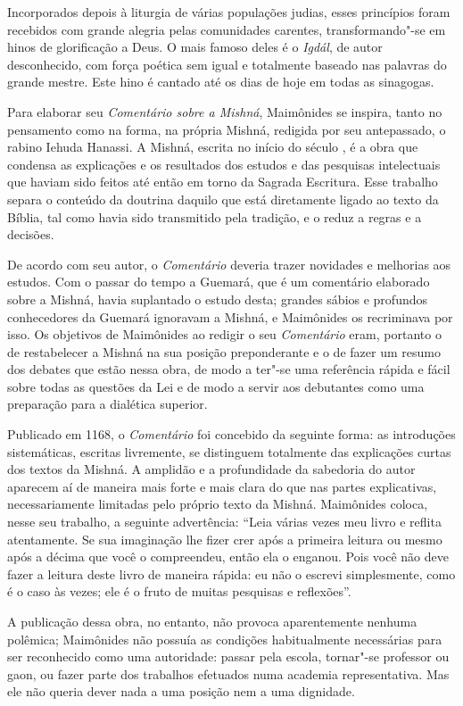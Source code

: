 Incorporados depois à liturgia de várias populações judias, esses
princípios foram recebidos com grande alegria pelas comunidades
carentes, transformando"-se em hinos de glorificação a Deus. O mais
famoso deles é o \emph{Igdál}, de autor desconhecido, com força poética sem
igual e totalmente baseado nas palavras do grande mestre. Este hino é
cantado até os dias de hoje em todas as sinagogas.

Para elaborar seu \emph{Comentário sobre a Mishná}, Maimônides se
inspira, tanto no pensamento como na forma, na própria Mishná,
redigida por seu antepassado, o rabino Iehuda Hanassi. A Mishná, escrita no
início do século , é a obra que condensa as explicações e os
resultados dos estudos e das pesquisas intelectuais que haviam sido
feitos até então em torno da Sagrada Escritura. Esse trabalho separa o
conteúdo da doutrina daquilo que está diretamente ligado ao texto da
Bíblia, tal como havia sido transmitido pela tradição, e o reduz a
regras e a decisões.

De acordo com seu autor, o \emph{Comentário} deveria trazer novidades e
melhorias aos estudos. Com o passar do tempo a Guemará, que é um
comentário elaborado sobre a Mishná, havia suplantado o estudo
desta; grandes sábios e profundos conhecedores da Guemará
ignoravam a Mishná, e Maimônides os recriminava por isso. Os
objetivos de Maimônides ao redigir o seu \emph{Comentário} eram,
portanto o de restabelecer a Mishná na sua posição preponderante
e o de fazer um resumo dos debates que estão nessa obra, de modo a
ter"-se uma referência rápida e fácil sobre todas as questões da Lei e de
modo a servir aos debutantes como uma preparação para a dialética
superior.

Publicado em 1168, o \emph{Comentário} foi concebido da seguinte forma:
as introduções sistemáticas, escritas livremente, se distinguem
totalmente das explicações curtas dos textos da Mishná. A
amplidão e a profundidade da sabedoria do autor aparecem aí de maneira
mais forte e mais clara do que nas partes explicativas, necessariamente
limitadas pelo próprio texto da Mishná. Maimônides coloca, nesse
seu trabalho, a seguinte advertência: ``Leia várias vezes meu livro e
reflita atentamente. Se sua imaginação lhe fizer crer após a primeira
leitura ou mesmo após a décima que você o compreendeu, então ela o
enganou. Pois você não deve fazer a leitura deste livro de maneira
rápida: eu não o escrevi simplesmente, como é o caso às vezes; ele é o
fruto de muitas pesquisas e reflexões''.

A publicação dessa obra, no entanto, não provoca aparentemente nenhuma
polêmica; Maimônides não possuía as condições habitualmente necessárias
para ser reconhecido como uma autoridade: passar pela escola, tornar"-se
professor ou gaon, ou fazer parte dos trabalhos efetuados numa academia
representativa. Mas ele não queria dever nada a uma posição nem a uma
dignidade.

